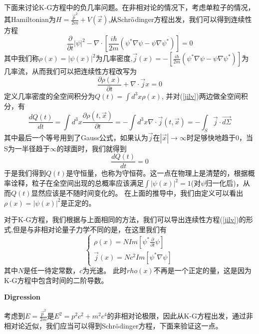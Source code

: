 下面来讨论K-G方程中的负几率问题。在非相对论的情况下，考虑单粒子的情况，其Hamiltonian为$H=\frac{\vec{p}^{2}}{2m}+V(\vec{x})$,从Schr$\ddot{\rm{o}}$dinger方程出发，我们可以得到连续性方程
\begin{equation}
    \frac{\partial}{\partial t}|\psi|^{2}-\nabla \cdot \left[\frac{i\hbar}{2m}\left(\psi^{*}\nabla\psi-\psi \nabla\psi^{*}\right)\right]=0
\end{equation}
其中我们称$\rho(x)=|\psi(x)|^{2}$为几率密度,$\vec{j}(x)=-\left[\frac{i\hbar}{2m}\left(\psi^{*}\nabla\psi-\psi \nabla\psi^{*}\right)\right]$为几率流，从而我们可以把连续性方程改写为
\begin{equation}
\label{jilv}
    \frac{\partial \rho(x)}{\partial t}+\nabla \cdot \vec{j}{x}=0
\end{equation}
定义几率密度的全空间积分为$Q(t)=\int d^{3}x\rho(x)$,
并对(\ref{jilv})两边做全空间积分，有
\begin{equation}
    \frac{dQ(t)}{dt}=\int d^{3}x \frac{\partial \rho(t,\vec{x})}{\partial t}=-\int d^{3}x \nabla \cdot \vec{j}(t,\vec{x})=-\int_{S}\vec{j}\cdot \vec{d\Sigma}
\end{equation}
其中最后一个等号用到了Gauss公式，如果认为$\vec{j}$在$|\vec{x}|\rightarrow \infty$时足够快地趋于0，当S为一半径趋于$\infty$的球面时，我们就得到
\begin{equation}
    \frac{dQ(t)}{dt}=0
\end{equation}
于是我们得到$Q(t)$是守恒量，也称为守恒荷。这一点在物理上是清楚的，根据概率诠释，粒子在全空间出现的总概率应该满足$\int |\psi(x)|^{2}=1$(对$\psi$归一化后)，从而$Q(t)$显然应该是不随时间变化的。
在上面的推导中，我们由定义可以看出$\rho(x)=|\psi(x)|^{2}$是正定的。

对于K-G方程，我们根据与上面相同的方法，我们可以导出连续性方程(\ref{jilv})的形式,但是与非相对论量子力学不同的是，在这里我们有
\begin{equation}
\left\{
        \begin{array}{ll}
            \rho(x)=N Im \left[\psi^{*}\frac{\partial}{\partial t}\psi\right] \\
            \vec{j}(x)=Nc^{2}Im \left[\psi^{*}\nabla \psi\right]
        \end{array}
    \right.
\end{equation}
其中$N$是任一待定常数，$c$为光速。
此时$rho(x)$不再是一个正定的量，这是因为K-G方程中包含时间的二阶导数。
\begin{center}
   \textbf{Digression} 
\end{center}

考虑到$E=\frac{\vec{p}^{2}}{2m}$是$E^{2}=p^{2}c^{2}+m^{2}c^{4}$的非相对论极限，因此从K-G方程出发，通过非相对论近似，我们应当可以得到Schr$\ddot{\rm{o}}$dinger方程，下面来验证这一点。

